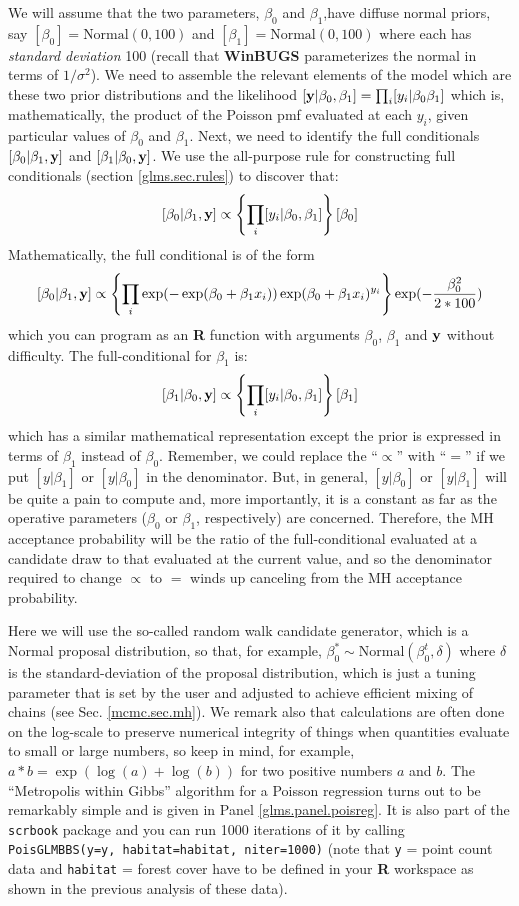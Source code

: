 We will assume that the two parameters, $\beta_0$ and $\beta_1$,have diffuse
normal priors, say $[\beta_0] = \mbox{Normal}(0,100)$ and
$[\beta_1]=\mbox{Normal}(0,100)$ where each has {\it standard deviation}
100 (recall that {\bf WinBUGS} parameterizes the normal in terms of $1/\sigma^{2}$).
We need to assemble the relevant elements of the model which are these
two prior distributions and the
likelihood $[{\bf y}|\beta_0,\beta_1] = \prod_{i} [y_i|\beta_0 \beta_1] $ which is,
mathematically, the product of the Poisson pmf evaluated at each $y_i$,
given particular values of $\beta_0$ and $\beta_1$.
Next, we need to identify the full conditionals
$[\beta_0|\beta_1, {\bf y}]$ and $[\beta_1|\beta_0,{\bf y}]$.  We use the all-purpose
rule for constructing full conditionals
(section \ref{glms.sec.rules})
 to discover that:
\[
 [\beta_0|\beta_1,{\bf y}] \propto \left\{ \prod_{i} [y_{i}|\beta_0,\beta_1]\right\}[\beta_0]
\]
Mathematically, the full conditional is of the form
\[
 [\beta_0|\beta_1,{\bf y}] \propto
\left\{ \prod_{i} 
\exp(-\exp(\beta_{0} + \beta_{1} x_{i}))
\exp(\beta_{0} + \beta_{1} x_{i})^{y_{i}}
\right\}
\exp(-\frac{\beta_{0}^2}{2*100})
\]
which you can program as an {\bf R} function with arguments
$\beta_{0}$, $\beta_{1}$ and ${\bf y}$ without difficulty.
The full-conditional for $\beta_{1}$ is:
\[
 [\beta_1|\beta_0,{\bf y}] \propto \left\{ \prod_{i}
   [y_{i}|\beta_0,\beta_1]\right\} [\beta_1]
\]
which has a similar mathematical representation except the prior is
expressed in terms of $\beta_{1}$ instead of $\beta_{0}$.
Remember, we could replace the ``$\propto$'' with ``$=$'' if we
put $[y|\beta_1]$ or $[y|\beta_0]$ in the denominator. But, in general,
$[y|\beta_0]$ or $[y|\beta_1]$ will be quite a pain to compute and, more
importantly, it is a constant as far as the operative parameters
($\beta_0$ or $\beta_1$,
respectively) are concerned. Therefore,
the MH acceptance probability will be the ratio of the
full-conditional evaluated at a candidate draw to that evaluated at the
current value, and so the denominator required to change $\propto$ to $=$
winds up canceling from the MH acceptance probability.

Here we will
use the so-called random walk candidate generator, which is a Normal proposal distribution, so that, for example,
 $\beta_0^{*} \sim \mbox{Normal}(\beta_0^{t},\delta)$ where $\delta$ is
 the standard-deviation of the proposal distribution, which is just a
 tuning parameter that is set by the user and adjusted to achieve
 efficient mixing of chains (see Sec. \ref{mcmc.sec.mh}).
We remark also that calculations are often done on the log-scale to
preserve numerical integrity of things when quantities evaluate to
small or large numbers, so keep in mind, for example,
$a*b = \exp(\log(a) + \log(b))$ for two positive numbers $a$ and $b$.
 The ``Metropolis within
Gibbs'' algorithm for a Poisson regression turns out to be remarkably
simple and is given in Panel \ref{glms.panel.poisreg}. It is also part
of the {\tt scrbook} package and you can run 1000 iterations of it by
calling {\tt PoisGLMBBS(y=y, habitat=habitat, niter=1000)} (note that
{\tt y} = point count data and {\tt habitat} = forest cover have to
be defined in your {\bf R} workspace as shown in  the previous
analysis of these data).

